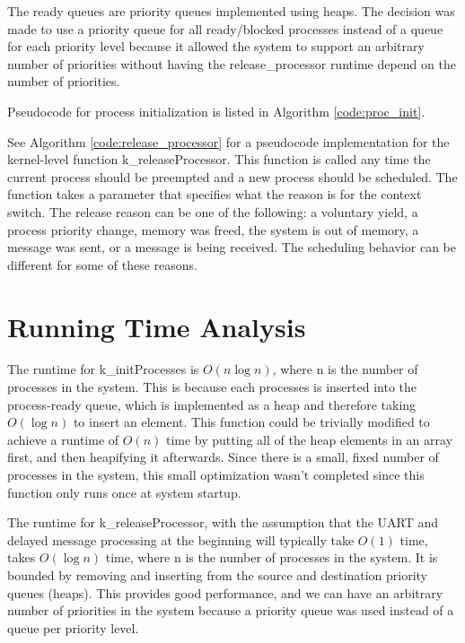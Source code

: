 \documentclass[12pt]{report}
\begin{document}
    The ready queues are priority queues implemented using heaps. The decision
    was made to use a priority queue for all ready/blocked processes instead of
    a queue for each priority level because it allowed the system to support an
    arbitrary number of priorities without having the release\_processor runtime
    depend on the number of priorities.

    Pseudocode for process initialization is listed in Algorithm
    \ref{code:proc_init}.

    See Algorithm \ref{code:release_processor} for a pseudocode implementation
    for the kernel-level function k\_releaseProcessor. This function is called
    any time the current process should be preempted and a new process should be
    scheduled. The function takes a parameter that specifies what the reason is
    for the context switch. The release reason can be one of the following: a
    voluntary yield, a process priority change, memory was freed, the system is
    out of memory, a message was sent, or a message is being received. The scheduling
    behavior can be different for some of these reasons.

\section{Running Time Analysis}

    The runtime for k\_initProcesses is $O(n\log n)$, where n is the number of
    processes in the system. This is because each processes is inserted into the
    process-ready queue, which is implemented as a heap and therefore taking
    $O(\log n)$ to insert an element. This function could be trivially modified
    to achieve a runtime of $O(n)$ time by putting all of the heap elements in
    an array first, and then heapifying it afterwards. Since there is a
    small, fixed number of processes in the system, this small optimization
    wasn't completed since this function only runs once at system startup.

    The runtime for k\_releaseProcessor, with the assumption that the UART and
    delayed message processing at the beginning will typically take $O(1)$ time,
    takes $O(\log n)$ time, where n is the number of processes in the system. It
    is bounded by removing and inserting from the source and destination
    priority queues (heaps). This provides good performance, and we can have an
    arbitrary number of priorities in the system because a priority queue was
    used instead of a queue per priority level.
\end{document}
